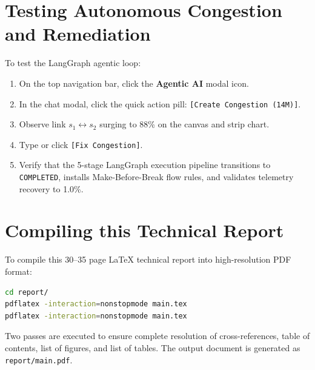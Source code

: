 \section{Testing Autonomous Congestion and Remediation}
To test the LangGraph agentic loop:
\begin{enumerate}
  \item On the top navigation bar, click the \textbf{Agentic AI} modal icon.
  \item In the chat modal, click the quick action pill: \texttt{[Create Congestion (14M)]}.
  \item Observe link $s_1 \leftrightarrow s_2$ surging to 88\% on the canvas and strip chart.
  \item Type or click \texttt{[Fix Congestion]}.
  \item Verify that the 5-stage LangGraph execution pipeline transitions to \texttt{COMPLETED}, installs Make-Before-Break flow rules, and validates telemetry recovery to 1.0\%.
\end{enumerate}

\section{Compiling this Technical Report}
To compile this 30--35 page LaTeX technical report into high-resolution PDF format:
\begin{lstlisting}[language=bash]
cd report/
pdflatex -interaction=nonstopmode main.tex
pdflatex -interaction=nonstopmode main.tex
\end{lstlisting}
Two passes are executed to ensure complete resolution of cross-references, table of contents, list of figures, and list of tables. The output document is generated as \texttt{report/main.pdf}.

